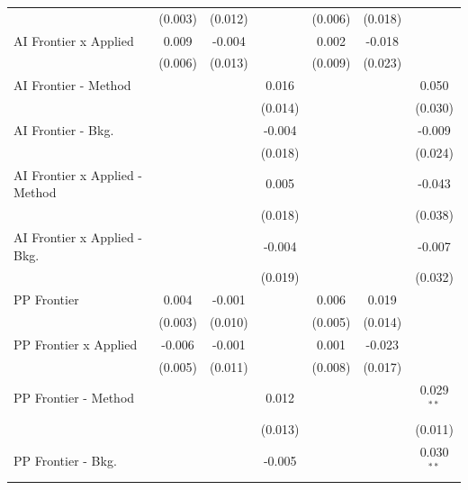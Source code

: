 \begin{tabular}{lcccccc}
                                  & (0.003)     & (0.012) &               & (0.006) & (0.018) &   \\   
   AI Frontier x Applied          & 0.009       & -0.004  &               & 0.002   & -0.018  &   \\   
                                  & (0.006)     & (0.013) &               & (0.009) & (0.023) &   \\   
   AI Frontier - Method           &             &         & 0.016         &         &         & 0.050\\   
                                  &             &         & (0.014)       &         &         & (0.030)\\   
   AI Frontier - Bkg.             &             &         & -0.004        &         &         & -0.009\\   
                                  &             &         & (0.018)       &         &         & (0.024)\\   
   AI Frontier x Applied - Method &             &         & 0.005         &         &         & -0.043\\   
                                  &             &         & (0.018)       &         &         & (0.038)\\   
   AI Frontier x Applied - Bkg.   &             &         & -0.004        &         &         & -0.007\\   
                                  &             &         & (0.019)       &         &         & (0.032)\\   
   PP Frontier                    & 0.004       & -0.001  &               & 0.006   & 0.019   &   \\   
                                  & (0.003)     & (0.010) &               & (0.005) & (0.014) &   \\   
   PP Frontier x Applied          & -0.006      & -0.001  &               & 0.001   & -0.023  &   \\   
                                  & (0.005)     & (0.011) &               & (0.008) & (0.017) &   \\   
   PP Frontier - Method           &             &         & 0.012         &         &         & 0.029$^{**}$\\   
                                  &             &         & (0.013)       &         &         & (0.011)\\   
   PP Frontier - Bkg.             &             &         & -0.005        &         &         & 0.030$^{**}$\\   

\end{tabular}
